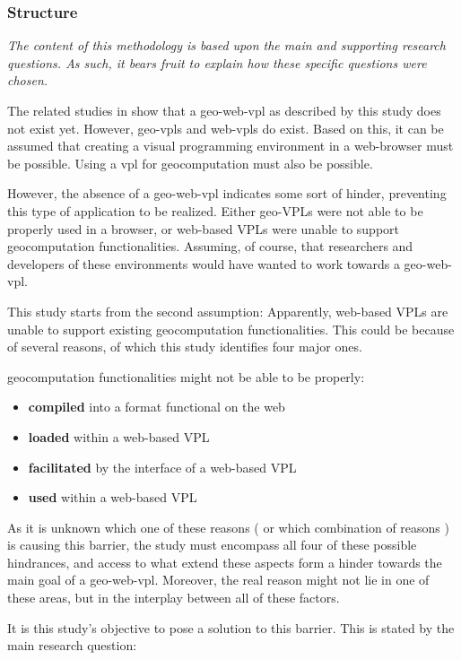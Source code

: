\subsubsection*{Structure}
  
\emph{The content of this methodology is based upon the main and supporting research questions. 
As such, it bears fruit to explain how these specific questions were chosen.}

The related studies in  show that a \ac{geo-web-vpl} as described by this study does not exist yet. However, geo-vpls and web-vpls do exist. 
Based on this, it can be assumed that creating a visual programming environment in a web-browser must be possible. 
Using a \ac*{vpl} for geocomputation must also be possible. 

However, the absence of a geo-web-vpl indicates some sort of hinder, preventing this type of application to be realized. Either geo-VPLs were not able to be properly used in a browser, or web-based VPLs were unable to support geocomputation functionalities. 
Assuming, of course, that researchers and developers of these environments would have wanted to work towards a \ac{geo-web-vpl}.

This study starts from the second assumption: 
Apparently, web-based VPLs are unable to support existing geocomputation functionalities. 
This could be because of several reasons, of which this study identifies four major ones.

geocomputation functionalities might not be able to be properly:
\begin{itemize}[-]
  \item \textbf{compiled} into a format functional on the web
  \item \textbf{loaded} within a web-based VPL
  \item \textbf{facilitated} by the interface of a web-based VPL
  \item \textbf{used} within a web-based VPL
\end{itemize}
As it is unknown which one of these reasons ( or which combination of reasons ) is causing this barrier, the study must encompass all four of these possible hindrances, and access to what extend these aspects form a hinder towards the main goal of a \ac{geo-web-vpl}. 
Moreover, the real reason might not lie in one of these areas, but in the interplay between all of these factors. 

It is this study's objective to pose a solution to this barrier. This is stated by the main research question: \myMainRQ 

